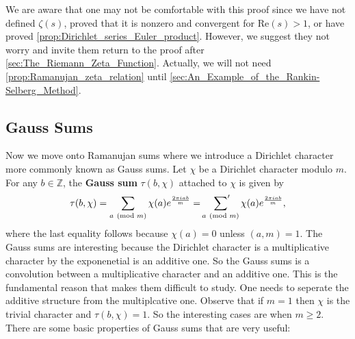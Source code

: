 \documentclass[12pt]{book}
\theoremstyle{definition}\newframedtheorem{method}{Method}
\newcommand{\psum}{\sideset{}{'}\sum}
\newcommand{\tmod}[1]{\ \left(\text{mod }#1\right)}
\newcommand{\Z}{\mathbb{Z}}
\newcommand{\z}{\zeta}
\newcommand{\<}{\langle}
\renewcommand{\>}{\rangle}
\renewcommand{\Re}{\mathrm{Re}}
\begin{document}
      We are aware that one may not be comfortable with this proof since we have not defined $\z(s)$, proved that it is nonzero and convergent for $\Re(s) > 1$, or have proved \cref{prop:Dirichlet_series_Euler_product}. However, we suggest they not worry and invite them return to the proof after \cref{sec:The_Riemann_Zeta_Function}. Actually, we will not need \cref{prop:Ramanujan_zeta_relation} until \cref{sec:An_Example_of_the_Rankin-Selberg_Method}.
    \subsection*{Gauss Sums}
      Now we move onto Ramanujan sums where we introduce a Dirichlet character more commonly known as Gauss sums. Let $\chi$ be a Dirichlet character modulo $m$. For any $b \in \Z$, the \textbf{Gauss sum} $\tau(b,\chi)$ attached to $\chi$ is given by
      \[
        \tau(b,\chi) = \sum_{a \tmod{m}}\chi(a)e^{\frac{2\pi iab}{m}} = \psum_{a \tmod{m}}\chi(a)e^{\frac{2\pi iab}{m}},
      \]
      where the last equality follows because $\chi(a) = 0$ unless $(a,m) = 1$. The Gauss sums are interesting because the Dirichlet character is a multiplicative character by the exponenetial is an additive one. So the Gauss sums is a convolution between a multiplicative character and an additive one. This is the fundamental reason that makes them difficult to study. One needs to seperate the additive structure from the multiplcative one. Observe that if $m = 1$ then $\chi$ is the trivial character and $\tau(b,\chi) = 1$. So the interesting cases are when $m \ge 2$. There are some basic properties of Gauss sums that are very useful:
\end{document}
